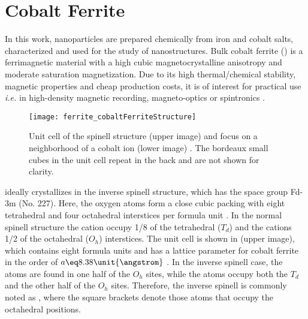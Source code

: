 \documentclass[\main/dresen_thesis.tex]{subfiles}
\begin{document}
\section{Cobalt Ferrite}\label{ch:theoreticalBackground:ferrites}
  In this work, nanoparticles are prepared chemically from iron and cobalt salts, characterized and used for the study of nanostructures.
  Bulk cobalt ferrite () is a ferrimagnetic material with a high cubic magnetocrystalline anisotropy and moderate saturation magnetization.
  Due to its high thermal/chemical stability, magnetic properties and cheap production costs, it is of interest for practical use \textit{i.e.} in high-density magnetic recording\cite{Wu_2014_Monol}, magneto-optics \cite{Jung_2005_CoFe2} or spintronics \cite{Ramos_2007_Roomt}.

  \begin{figure}[tb]
    \centering
    \texttt{[image: ferrite\_cobaltFerriteStructure]}
    \caption{\label{fig:theoreticalBackground:ferrites:cofe2o4Structure}Unit cell of the spinell structure  (upper image) \cite{Sickafus_1999_Struc} and focus on a neighborhood of a cobalt ion (lower image) \cite{Tachiki_1960_Origi}. The bordeaux small cubes in the unit cell repeat in the back and are not shown for clarity.}
  \end{figure}

   ideally crystallizes in the inverse spinell structure, which has the space group Fd-3m (No. 227).
  Here, the oxygen atoms form a close cubic packing with eight tetrahedral and four octahedral interstices per formula unit \cite{Sickafus_1999_Struc}.
  In the normal spinell structure  the  cation occupy 1/8 of the tetrahedral ($T_d$) and the  cations 1/2 of the octahedral ($O_h$) interstices.
  The unit cell is shown in  (upper image), which contains eight formula units and has a lattice parameter for cobalt ferrite in the order of $a \eq 8.38 \unit{\angstrom}$ \cite{Goldman_1999_Cryst}.
  In the inverse spinell case, the  atoms are found in one half of the $O_h$ sites, while the  atoms occupy both the $T_d$ and the other half of the $O_h$ sites.
  Therefore, the inverse spinell is commonly noted as , where the square brackets denote those atoms that occupy the octahedral positions.
\end{document}
